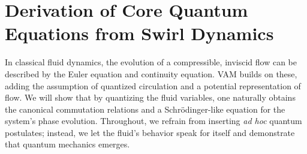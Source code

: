 \documentclass[preprint]{revtex4-2}
\begin{document}
\section{Derivation of Core Quantum Equations from Swirl Dynamics}
    In classical fluid dynamics, the evolution of a compressible, inviscid flow can be described by the Euler equation and continuity equation. VAM builds on these, adding the assumption of quantized circulation and a potential representation of flow. We will show that by quantizing the fluid variables, one naturally obtains the canonical commutation relations and a Schrödinger-like equation for the system’s phase evolution. Throughout, we refrain from inserting \emph{ad hoc} quantum postulates; instead, we let the fluid’s behavior speak for itself and demonstrate that quantum mechanics emerges.
\end{document}
